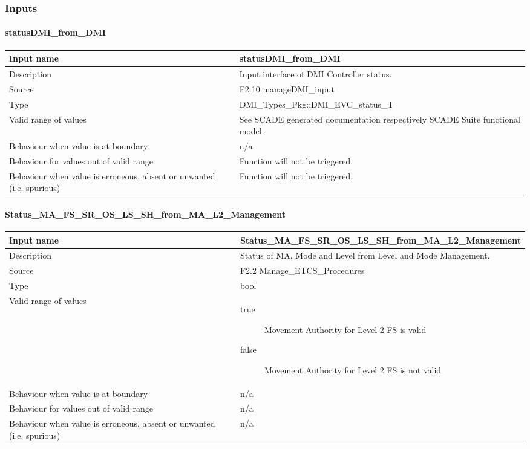 \subsubsection{Inputs}\label{s:etcs_procedures_inputs}

\paragraph{statusDMI\_from\_DMI}

\begin{longtable}{p{}p{}}
\toprule
Input name				& statusDMI\_from\_DMI \\
\midrule
Description				& Input interface of DMI Controller status. \\
\midrule
Source					& F2.10 manageDMI\_input  \\ 
\midrule
Type					& DMI\_Types\_Pkg::DMI\_EVC\_status\_T \\
\midrule
Valid range of values	& See SCADE generated documentation respectively SCADE Suite functional model. \\
\midrule
Behaviour when value is at boundary	& n/a \\
\midrule
Behaviour for values out of valid range	& Function will not be triggered. \\
\midrule
Behaviour when value is erroneous, absent or unwanted (i.e. spurious) & Function will not be triggered. \\
\bottomrule
\end{longtable}


\paragraph{Status\_MA\_FS\_SR\_OS\_LS\_SH\_from\_MA\_L2\_Management}

\begin{longtable}{p{}p{}}
\toprule
Input name				& Status\_MA\_FS\_SR\_OS\_LS\_SH\_from\_MA\_L2\_Management \\
\midrule
Description				& Status of MA, Mode and Level from Level and Mode Management. \\
\midrule
Source					& F2.2 Manage\_ETCS\_Procedures \\ 
\midrule
Type					& bool \\
\midrule
Valid range of values	& \begin{description}
\item[true]Movement Authority for Level 2 FS is valid
\item[false]Movement Authority for Level 2 FS is not valid
\end{description} \\
\midrule
Behaviour when value is at boundary	& n/a \\
\midrule
Behaviour for values out of valid range	& n/a \\
\midrule
Behaviour when value is erroneous, absent or unwanted (i.e. spurious) & n/a \\
\bottomrule
\end{longtable}

